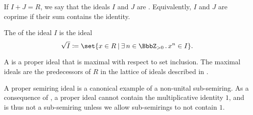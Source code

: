 \begin{definition}
\begin{thmenum}
     If \( I + J = R \), we say that the ideals \( I \) and \( J \) are . Equivalently, \( I \) and \( J \) are coprime if their sum contains the identity.

     The  of the ideal \( I \) is the ideal
    \begin{equation*}
      \sqrt I \coloneqq \set{ x \in R \given \qexists {n \in \BbbZ_{>0}} x^n \in I }.
    \end{equation*}

     A  is a proper ideal that is maximal with respect to set inclusion. The maximal ideals are the predecessors of \( R \) in the lattice of ideals described in .
  \end{thmenum}
\end{definition}

\begin{remark}\label{rem:semiring_ideal_as_sub_semiring}
  A proper semiring ideal is a canonical example of a non-unital sub-semiring. As a consequence of , a proper ideal cannot contain the multiplicative identity \( 1 \), and is thus not a sub-semiring unless we allow sub-semirings to not contain \( 1 \).
\end{remark}


